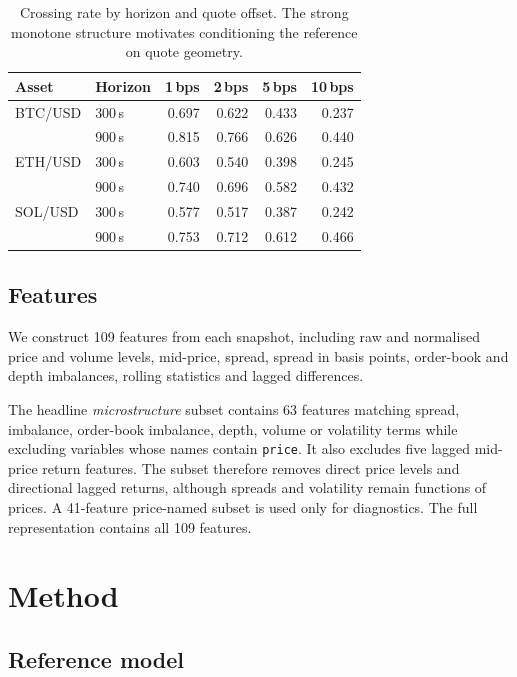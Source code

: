 \documentclass[11pt]{article}
\begin{document}
\begin{table}[ht]
\centering
\caption{Crossing rate by horizon and quote offset. The strong monotone
structure motivates conditioning the reference on quote geometry.}
\label{tab:marginals}
\begin{tabular}{llrrrr}
\toprule
Asset & Horizon & 1\,bps & 2\,bps & 5\,bps & 10\,bps \\
\midrule
BTC/USD & 300\,s & 0.697 & 0.622 & 0.433 & 0.237 \\
& 900\,s & 0.815 & 0.766 & 0.626 & 0.440 \\
ETH/USD & 300\,s & 0.603 & 0.540 & 0.398 & 0.245 \\
& 900\,s & 0.740 & 0.696 & 0.582 & 0.432 \\
SOL/USD & 300\,s & 0.577 & 0.517 & 0.387 & 0.242 \\
& 900\,s & 0.753 & 0.712 & 0.612 & 0.466 \\
\bottomrule
\end{tabular}
\end{table}

\subsection{Features}

We construct 109 features from each snapshot, including raw and normalised price
and volume levels, mid-price, spread, spread in basis points, order-book and
depth imbalances, rolling statistics and lagged differences.

The headline \emph{microstructure} subset contains 63 features matching spread,
imbalance, order-book imbalance, depth, volume or volatility terms while
excluding variables whose names contain \texttt{price}. It also excludes five
lagged mid-price return features. The subset therefore removes direct price
levels and directional lagged returns, although spreads and volatility remain
functions of prices. A 41-feature price-named subset is used only for
diagnostics. The full representation contains all 109 features.

\section{Method}
\label{sec:method}

\subsection{Reference model}
\end{document}

